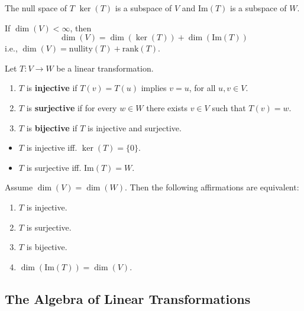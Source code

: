 \begin{theorem}
	The null space of $T$ $\ker(T) $ is a subspace of $V$ and $\text{Im}(T)$ is a subspace of $W$.
\end{theorem}

\begin{theorem}\label{thm:rank-null}
	If $\dim(V) < \infty$, then
	\[
		\dim(V) = \dim(\ker(T)) + \dim(\text{Im}(T))
	\]
	i.e., $\dim(V) = \text{nullity}(T) + \text{rank}(T)$.
\end{theorem}

\begin{definition}
	Let $T : V \longrightarrow W$ be a linear transformation. 
	\begin{enumerate}
		\item $T$ is \textbf{injective} if $T(v) = T(u)$ implies $v = u$, for all $u, v \in V$.
		\item $T$ is \textbf{surjective} if for every $w \in W$ there exists $v \in V$ such that $T(v) = w$.
		\item $T$ is \textbf{bijective} if $T$ is injective and surjective.
	\end{enumerate}
\end{definition}

\begin{theorem}\hfill
	\begin{itemize}
		\item $T$ is injective iff. $\ker(T)  = \{ 0 \}$.	
		\item $T$ is surjective iff. $\text{Im}(T) = W$.
	\end{itemize}
\end{theorem}

\begin{theorem}
	Assume $\dim(V) = \dim(W)$. Then the following affirmations are equivalent:
	\begin{enumerate}
		\item $T$ is injective.
		\item $T$ is surjective.
		\item $T$ is bijective.
		\item $\dim(\text{Im}(T)) = \dim(V)$. 
	\end{enumerate}
\end{theorem}

\subsection{The Algebra of Linear Transformations}

